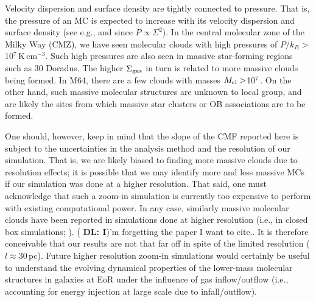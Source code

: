 \documentclass[iop]{emulateapj}
\newcommand{\DL}[1]{({\bf \color{dlcolor} DL: #1})}
\begin{document}
Velocity dispersion and surface density are tightly connected to pressure. 
That is, the pressure of an MC is expected to increase with its velocity dispersion and surface density (see e.g.,  and 
since $P\propto\Sigma^2$).
In the central molecular zone of the Milky Way (CMZ), we have seen molecular clouds with high pressures of 
$P/k_B > $10$^7$\,K\,cm$^{-3}$. Such high pressures are also seen in massive star-forming regions such as 30 Doradus.
The higher $\Sigma_{\rm gas}$ in turn is related to more massive clouds being formed.
In M64, there are a few clouds with masses $M_{\rm cl}>$10$^7$\,\Msun. 
On the other hand, such massive molecular structures are unknown to local group, and are likely the sites 
from which massive star clusters or OB associations are to be formed.


One should, however, keep in mind that 
the slope of the CMF reported here is subject
to the uncertainties in the analysis method and the resolution of our simulation. 
That is, we are likely biased to finding more massive clouds due to resolution effects; 
it is possible that we may identify more and less massive MCs if our simulation 
was done at a higher resolution. 
That said, one must acknowledge that such a zoom-in simulation is currently too expensive to perform with 
existing computational power.
In any case, similarly massive molecular clouds have been reported in simulations done at higher resolution (i.e., 
in closed box simulations; \citealt{}). 
{\DL I'm forgetting the paper I want to cite..}
It is therefore conceivable that our results are not that far off in spite of the limited resolution ($l\approx$30\,pc).
Future higher resolution zoom-in simulations would certainly be useful to understand
the evolving dynamical properties of the lower-mass molecular structures in
galaxies at EoR under the influence of gas inflow/outflow (i.e., accounting for energy injection at large scale due to infall/outflow).
% 




\end{document}
